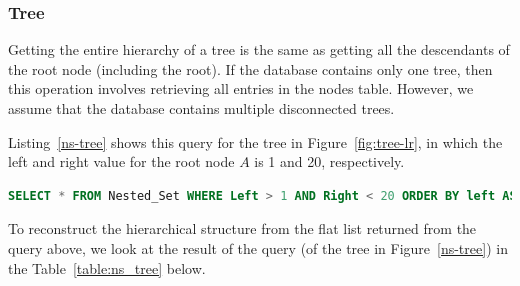 




\subsubsection{Tree}

Getting the entire hierarchy of a tree is the same as getting all the descendants of the root node (including the root). If the database contains only one tree, then this operation involves retrieving all entries in the nodes table. However, we assume that the database contains multiple disconnected trees.

Listing~\ref{ns-tree} shows this query for the tree in Figure~\ref{fig:tree-lr}, in which the left and right value for the root node $A$ is 1 and 20, respectively.

\begin{lstlisting}[language=sql, caption={Query for Tree for tree $A$ via nested set model},label=ns-tree]
SELECT * FROM Nested_Set WHERE Left > 1 AND Right < 20 ORDER BY left ASC
\end{lstlisting}

To reconstruct the hierarchical structure from the flat list returned from the query above, we look at the result of the query (of the tree in Figure~\ref{ns-tree}) in the Table~\ref{table:ns_tree} below.

